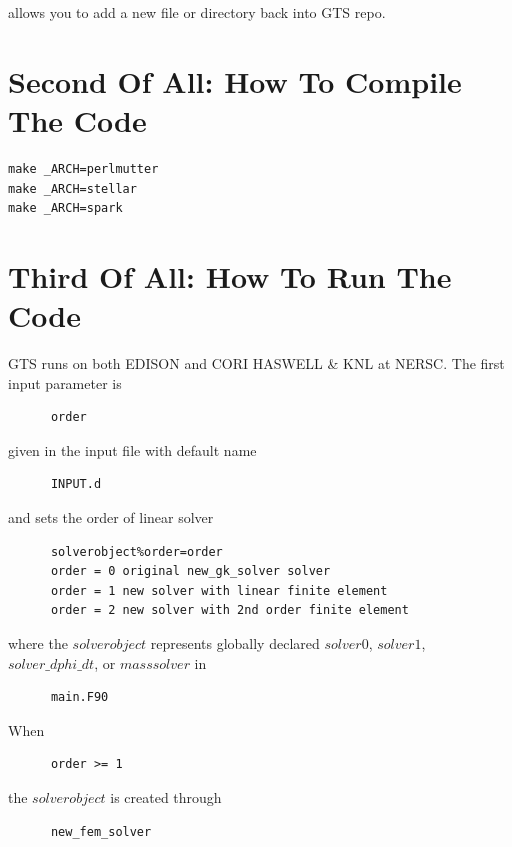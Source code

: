\documentclass{report}
\begin{document}
\noindent
allows you to add a new file or directory back into GTS repo.
\fi



\section{Second Of All: How To Compile The Code}
\label{sec:compile}

\begin{verbatim}
make _ARCH=perlmutter
make _ARCH=stellar
make _ARCH=spark
\end{verbatim}


\section{Third Of All: How To Run The Code}
\label{sec:run}
GTS runs on both EDISON and CORI HASWELL \& KNL at NERSC.
The first input parameter is

\begin{verbatim}
      order 
\end{verbatim}

\noindent
given in the input file with default name

\begin{verbatim}
      INPUT.d
\end{verbatim}

\noindent
and sets the order of linear solver

\begin{verbatim}
      solverobject%order=order
      order = 0 original new_gk_solver solver
      order = 1 new solver with linear finite element
      order = 2 new solver with 2nd order finite element
\end{verbatim}

\noindent
where the $solverobject$
represents globally declared $solver0$, $solver1$, $solver\_dphi\_dt$, or $masssolver$ in 

\begin{verbatim}
      main.F90
\end{verbatim}

\noindent
When

\begin{verbatim}
      order >= 1
\end{verbatim}

\noindent
the $solverobject$ is created through

\begin{verbatim}
      new_fem_solver
\end{verbatim}
\end{document}
